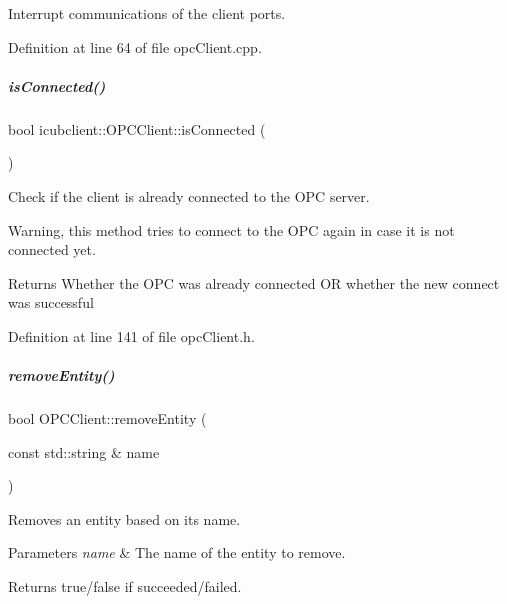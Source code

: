 Interrupt communications of the client ports. 



Definition at line 64 of file opc\+Client.\+cpp.

\mbox{\label{group__icubclient__clients_aa4d162f66e8a7c1b3418e331fcc0556f}} 
\subparagraph{\texorpdfstring{is\+Connected()}{isConnected()}}
{\footnotesize\ttfamily bool icubclient\+::\+O\+P\+C\+Client\+::is\+Connected (\begin{DoxyParamCaption}{ }\end{DoxyParamCaption})\hspace{0.3cm}{\ttfamily [inline]}}



Check if the client is already connected to the O\+PC server. 

Warning, this method tries to connect to the O\+PC again in case it is not connected yet. \begin{DoxyReturn}{Returns}
Whether the O\+PC was already connected OR whether the new connect was successful 
\end{DoxyReturn}


Definition at line 141 of file opc\+Client.\+h.

\mbox{\label{group__icubclient__clients_a19a6372fc0c11da66009ba4e11ac6b38}} 
\subparagraph{\texorpdfstring{remove\+Entity()}{removeEntity()}\hspace{0.1cm}{\footnotesize\ttfamily [1/2]}}
{\footnotesize\ttfamily bool O\+P\+C\+Client\+::remove\+Entity (\begin{DoxyParamCaption}\item[{const std\+::string \&}]{name }\end{DoxyParamCaption})}



Removes an entity based on its name. 


\begin{DoxyParams}{Parameters}
{\em name} & The name of the entity to remove. \\
\hline
\end{DoxyParams}
\begin{DoxyReturn}{Returns}
true/false if succeeded/failed. 
\end{DoxyReturn}


